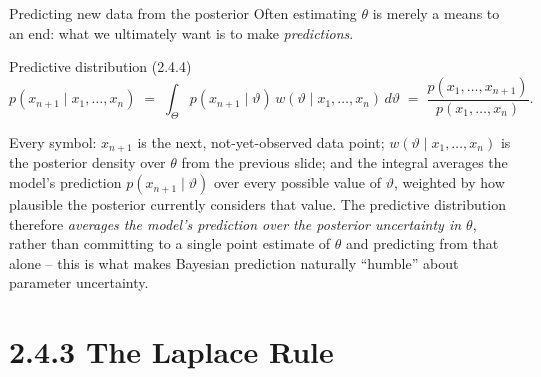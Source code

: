 \documentclass[aspectratio=169,10pt]{beamer}
\begin{document}
\begin{frame}{Predicting new data from the posterior}
  Often estimating $\theta$ is merely a means to an end: what we ultimately
  want is to make \emph{predictions}.

  \begin{block}{Predictive distribution (2.4.4)}
    \[
      p(x_{n+1}\mid x_1,\ldots,x_n) \;=\; \int_\Theta p(x_{n+1}\mid\vartheta)\,w(\vartheta\mid x_1,\ldots,x_n)\,d\vartheta
      \;=\; \frac{p(x_1,\ldots,x_{n+1})}{p(x_1,\ldots,x_n)}.
    \]
  \end{block}
  Every symbol: $x_{n+1}$ is the next, not-yet-observed data point;
  $w(\vartheta\mid x_1,\ldots,x_n)$ is the posterior density over $\theta$
  from the previous slide; and the integral averages the model's
  prediction $p(x_{n+1}\mid\vartheta)$ over every possible value of
  $\vartheta$, weighted by how plausible the posterior currently considers
  that value. The predictive distribution therefore \emph{averages the
  model's prediction over the posterior uncertainty in $\theta$}, rather
  than committing to a single point estimate of $\theta$ and predicting
  from that alone -- this is what makes Bayesian prediction naturally
  ``humble'' about parameter uncertainty.
\end{frame}

\section{2.4.3 The Laplace Rule}
\end{document}
